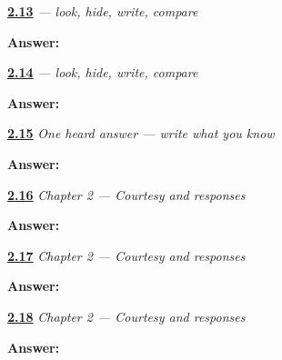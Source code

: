 \noindent\begin{minipage}[t]{\linewidth}
\raggedright
\hyperlink{review-GU-W01-haa-delayed-copy-vocalic-r-retrieval}{\textbf{2.13}} \emph{ — look, hide, write, compare}\par
\small \textbf{Answer:} \par
\end{minipage}\par\medskip

\noindent\begin{minipage}[t]{\linewidth}
\raggedright
\hyperlink{review-GU-W01-haa-delayed-copy-check}{\textbf{2.14}} \emph{ — look, hide, write, compare}\par
\small \textbf{Answer:} \par
\end{minipage}\par\medskip

\noindent\begin{minipage}[t]{\linewidth}
\raggedright
\hyperlink{review-GU-W01-haa-dictation-answer}{\textbf{2.15}} \emph{One heard answer — write what you know}\par
\small \textbf{Answer:} \par
\end{minipage}\par\medskip

\noindent\begin{minipage}[t]{\linewidth}
\raggedright
\hyperlink{review-GU-C01-practice-writing-payoff}{\textbf{2.16}} \emph{Chapter 2 — Courtesy and responses}\par
\small \textbf{Answer:} \par
\end{minipage}\par\medskip

\noindent\begin{minipage}[t]{\linewidth}
\raggedright
\hyperlink{review-GU-C01-practice-four-consonants}{\textbf{2.17}} \emph{Chapter 2 — Courtesy and responses}\par
\small \textbf{Answer:}    \par
\end{minipage}\par\medskip

\noindent\begin{minipage}[t]{\linewidth}
\raggedright
\hyperlink{review-GU-C01-practice-two-consonants-one-sign}{\textbf{2.18}} \emph{Chapter 2 — Courtesy and responses}\par
\small \textbf{Answer:}   \par
\end{minipage}\par\medskip

